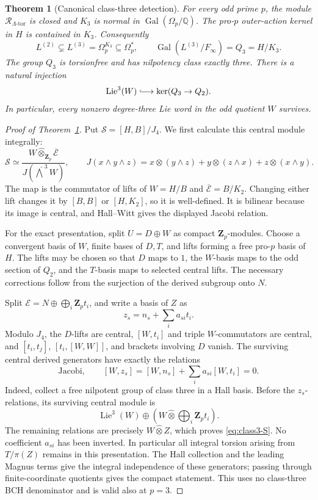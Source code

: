 \documentclass[11pt]{article}
\newtheorem{theorem}{Theorem}[section]
\theoremstyle{definition}\newtheorem{definition}[theorem]{Definition}
\begin{document}
\begin{theorem}[Canonical class-three detection]
\label{thm:canonical-class-three}
For every odd prime $p$, the module
$\mathcal R_{\Lambda\text{-tor}}$ is closed and $K_3$ is
normal in $\operatorname{Gal}(\Omega_p/\mathbb Q)$.
The pro-$p$ outer-action kernel in $H$ is contained in $K_3$.
Consequently
\[
 L^{(2)}\subsetneq L^{(3)}=\Omega_p^{K_3}\subseteq\Omega_p^*,
 \qquad \operatorname{Gal}(L^{(3)}/F_\infty)=Q_3=H/K_3.
\]
The group $Q_3$ is torsionfree and has nilpotency class exactly three.
There is a natural injection
\[
 \operatorname{Lie}^3(W)\lhook\joinrel\longrightarrow
                         \ker(Q_3\to Q_2).
\]
In particular, every nonzero degree-three Lie word in the odd
quotient $W$ survives.
\end{theorem}

\begin{proof}[Proof of Theorem~\ref{thm:canonical-class-three}]
Put \(\mathcal S=[H,B]/J_4\). We first calculate this central module
integrally:
\begin{equation}\label{eq:class3-S}
 \mathcal S\simeq
 \frac{W\widehat\otimes_{\mathbf Z_p}\overline{\mathcal E}}
 {J(\widehat{\bigwedge}^{\,3}W)},\qquad
 J(x\wedge y\wedge z)
 =x\otimes(y\wedge z)+y\otimes(z\wedge x)+z\otimes(x\wedge y).
\end{equation}
The map is the commutator of lifts of \(W=H/B\) and
\(\overline{\mathcal E}=B/K_2\). Changing either lift changes it by
\([B,B]\) or \([H,K_2]\), so it is well-defined.
It is bilinear because its image is central, and Hall--Witt
gives the displayed Jacobi relation.

For the exact presentation, split \(U=D\oplus W\) as compact
\(\mathbf Z_p\)-modules. Choose a convergent basis of \(W\),
finite bases of \(D,T\), and lifts forming a free pro-\(p\)
basis of \(H\). The lifts may be chosen so that \(D\) maps
to \(1\), the \(W\)-basis maps to the odd section of \(Q_2\),
and the \(T\)-basis maps to selected central lifts.
The necessary corrections follow from the surjection
of the derived subgroup onto \(N\).

Split \(\mathcal E=N\oplus\bigoplus_i\mathbf Z_pt_i\), and write a
basis of \(Z\) as
\[
 z_s=n_s+\sum_i a_{si}t_i.
\]
Modulo \(J_4\), the \(D\)-lifts are central,
\([W,t_i]\) and triple \(W\)-commutators are central,
and \([t_i,t_j]\), \([t_i,[W,W]]\), and brackets involving
\(D\) vanish. The surviving central derived generators
have exactly the relations
\[
 \text{Jacobi},\qquad
 [W,z_s]=[W,n_s]+\sum_i a_{si}[W,t_i]=0.
\]
Indeed, collect a free nilpotent group of class three in a
Hall basis. Before the \(z_s\)-relations, its surviving
central module is
\[
 \operatorname{Lie}^3(W)
 \oplus\left(W\widehat\otimes\bigoplus_i\mathbf Z_pt_i\right).
\]
The remaining relations are precisely \(W\widehat\otimes Z\),
which proves \eqref{eq:class3-S}. No coefficient \(a_{si}\)
has been inverted. In particular all integral torsion
arising from \(T/\pi(Z)\) remains in this presentation.
The Hall collection and the leading Magnus terms give
the integral independence of these generators; passing
through finite-coordinate quotients gives the compact
statement. This uses no class-three BCH denominator and
is valid also at \(p=3\).


\end{proof}
\end{document}
